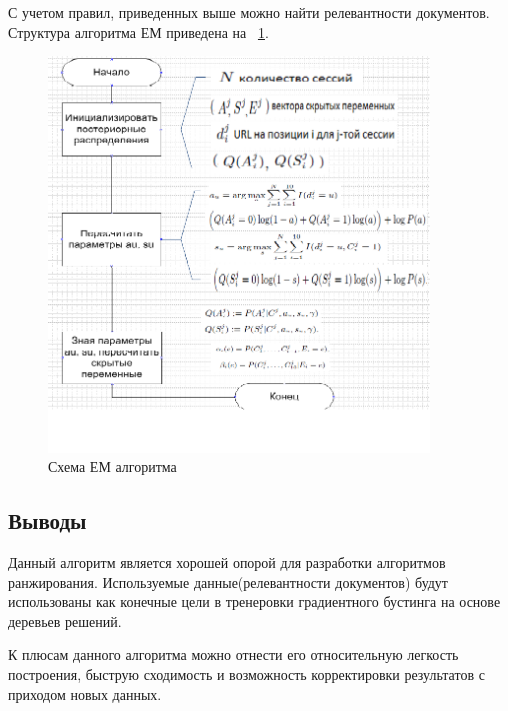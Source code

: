 С учетом правил, приведенных выше можно найти релевантности документов. Структура алгоритма ЕМ приведена на ~\ref{em-picture}.

\begin{figure}
  \centering
  \includegraphics[width=0.9\textwidth]{images/em_schema.png}
  \caption{Схема ЕМ алгоритма\label{em-picture}}
\end{figure}

\subsection{Выводы}
 
 Данный алгоритм является хорошей опорой для разработки алгоритмов ранжирования. Используемые данные(релевантности документов) будут использованы как конечные цели в тренеровки градиентного бустинга на основе деревьев решений.

К плюсам данного алгоритма можно отнести его относительную легкость построения, быструю сходимость и возможность корректировки результатов с приходом новых данных.